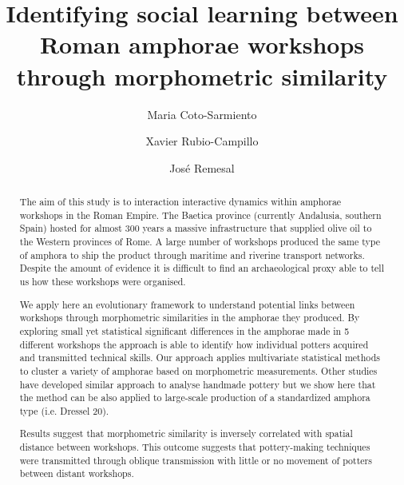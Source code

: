 \documentclass[review]{elsarticle}
\begin{document}
\begin{frontmatter}

\title{Identifying social learning between Roman amphorae workshops through morphometric similarity}


\author[bscadress]{Maria Coto-Sarmiento}


\author[edadress]{Xavier Rubio-Campillo}
\author[ceipacadress]{Jos\'e Remesal}


\address[bscadress]{Barcelona Supercomputing Center (BSC), Jordi Girona 29, Office 3A, Nexus II Building, 08034, Barcelona, Spain}
\address[edadress]{School of History, Classic \& Archaeology, Room OOM.33, William Robertson Wing, Old Medical School, Teviot Place, University of Edinburgh, UK}
\address[ceipacadress]{CEIPAC, Department of Prehistory and Archaeology, Montalegre, 6-8, 08001, University of Barcelona, Barcelona, Spain}

\begin{abstract}

The aim of this study is to interaction interactive dynamics within amphorae workshops in the Roman Empire. The Baetica province (currently Andalusia, southern Spain) hosted for almost 300 years a massive infrastructure that supplied olive oil to the Western provinces of Rome. A large number of workshops produced the same type of amphora to ship the product through maritime and riverine transport networks. Despite the amount of evidence it is difficult to find an archaeological proxy able to tell us how these workshops were organised.

We apply here an evolutionary framework to understand potential links between workshops through morphometric similarities in the amphorae they produced. By exploring small yet statistical significant differences in the amphorae made in 5 different workshops the approach is able to identify how individual potters acquired and transmitted technical skills.  Our approach applies multivariate statistical methods to cluster a variety of amphorae based on morphometric measurements. Other studies have developed similar approach to analyse handmade pottery but we show here that the method can be also applied to large-scale production of a standardized amphora type (i.e. Dressel 20).

Results suggest that morphometric similarity is inversely correlated with spatial distance between workshops. This outcome suggests that pottery-making techniques were transmitted through oblique transmission with little or no movement of potters between distant workshops.


\end{abstract}
\end{frontmatter}
\end{document}
